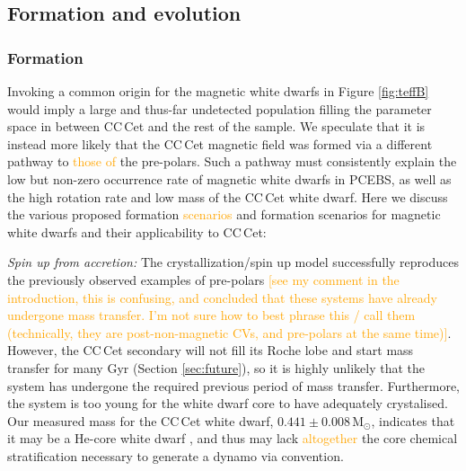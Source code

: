 \documentclass[fleqn,usenatbib]{mnras}
\newcommand{\Msun}{\mbox{$\mathrm{M}_{\odot}$}}
\newcommand{\bgc}[1]{\textcolor{orange}{[#1]}}
\newcommand{\bgs}[1]{\textcolor{orange}{#1}}
\newcommand{\dwc}[1]{\textcolor{green}{[#1]}}
\begin{document}


\subsection{Formation and evolution}

\subsubsection{Formation}
Invoking a common origin for the magnetic white dwarfs in Figure \ref{fig:teffB} would imply a large and thus-far undetected population filling the parameter space in between CC\,Cet and the rest of the sample. We speculate that it is instead more likely that the CC\,Cet magnetic field was formed via a different pathway to \bgs{those of} the pre-polars. Such a pathway must consistently explain the low but non-zero occurrence rate of magnetic white dwarfs in PCEBS, as well as the high rotation rate and low mass of the CC\,Cet white dwarf.
Here we discuss the various proposed formation \bgs{scenarios}
and formation scenarios for magnetic white dwarfs and their applicability to CC\,Cet:

\textit{Spin up from accretion:} The crystallization/spin up model \citep{iserneral17-1, schreiberetal21-1} successfully reproduces the previously observed examples of pre-polars \bgc{see my comment in the introduction, this is confusing, and \citet{schreiberetal21-1} concluded that these systems have already undergone mass transfer. I'm not sure how to best phrase this / call them (technically, they are post-non-magnetic CVs, and pre-polars at the same time)}. However, the CC\,Cet secondary will not fill its Roche lobe and start mass transfer for many Gyr (Section \ref{sec:future}), so it is highly unlikely that the system has undergone the required previous period of mass transfer. Furthermore, the system is too young for the white dwarf core to have adequately crystalised. Our measured mass for the CC\,Cet white dwarf, $0.441\pm0.008$\,\Msun, indicates that it may be a He-core white dwarf \citep{driebeetal98-1, althausetal13-1}, and thus may lack \bgs{altogether} the core chemical stratification necessary to generate a dynamo via convention. 
\end{document}
